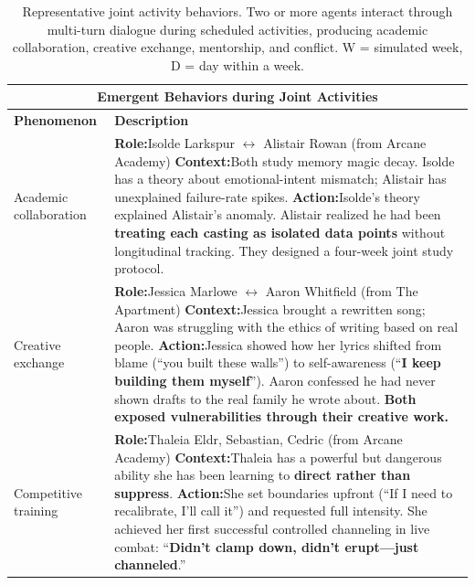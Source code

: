 \begin{table}[t]
\centering
\small
\caption{Representative joint activity behaviors. Two or more agents interact through multi-turn dialogue during scheduled activities, producing academic collaboration, creative exchange, mentorship, and conflict. W = simulated week, D = day within a week.}
\label{tab:joint}
\begin{tabular}{p{0.8in}p{4.3in}}
\toprule
\multicolumn{2}{c}{\textbf{Emergent Behaviors during Joint Activities}} \\
\midrule
\textbf{Phenomenon} & \textbf{Description} \\
\midrule

Academic \newline collaboration
&
\textbf{Role:}\quad Isolde Larkspur $\leftrightarrow$ Alistair Rowan \hfill (from Arcane Academy) \newline
\textbf{Context:}\quad Both study memory magic decay. Isolde has a theory about emotional-intent mismatch; Alistair has unexplained failure-rate spikes. \newline
\textbf{Action:}\quad Isolde's theory explained Alistair's anomaly. Alistair realized he had been \textbf{treating each casting as isolated data points} without longitudinal tracking. They designed a four-week joint study protocol.
\\
\midrule

Creative \newline exchange
&
\textbf{Role:}\quad Jessica Marlowe $\leftrightarrow$ Aaron Whitfield \hfill (from The Apartment) \newline
\textbf{Context:}\quad Jessica brought a rewritten song; Aaron was struggling with the ethics of writing based on real people. \newline
\textbf{Action:}\quad Jessica showed how her lyrics shifted from blame (``you built these walls'') to self-awareness (``\textbf{I keep building them myself}''). Aaron confessed he had never shown drafts to the real family he wrote about. \textbf{Both exposed vulnerabilities through their creative work.}
\\
\midrule

Competitive \newline training
&
\textbf{Role:}\quad Thaleia Eldr, Sebastian, Cedric \hfill (from Arcane Academy) \newline
\textbf{Context:}\quad Thaleia has a powerful but dangerous ability she has been learning to \textbf{direct rather than suppress}. \newline
\textbf{Action:}\quad She set boundaries upfront (``If I need to recalibrate, I'll call it'') and requested full intensity. She achieved her first successful controlled channeling in live combat: ``\textbf{Didn't clamp down, didn't erupt---just channeled}.''
\\
\midrule


\end{tabular}
\end{table}
